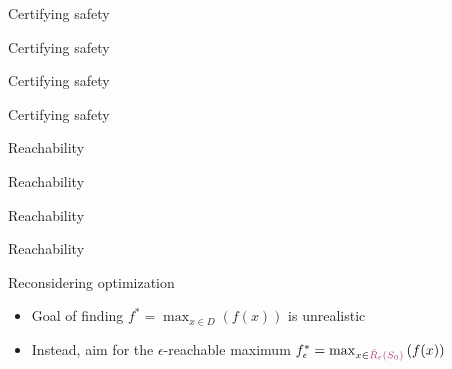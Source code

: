 \documentclass[xetex,10pt,mathserif,handout]{beamer}
\newlength\figureheight
\newlength\figurewidth
\newcommand{\Rbeps}{\bar{R}_{\epsilon}}
\newcommand{\ccrbeps}{{\color{magenta!70!black}\Rbeps(S_0)}\xspace}
\begin{document}
\begin{frame}{Certifying safety}
\centering
\setlength\figurewidth{5in}
\setlength\figureheight{3.5in}

\end{frame}

\begin{frame}{Certifying safety}
\centering
\setlength\figurewidth{5in}
\setlength\figureheight{3.5in}

\end{frame}

\begin{frame}{Certifying safety}
\centering
\setlength\figurewidth{5in}
\setlength\figureheight{3.5in}

\end{frame}

\begin{frame}{Certifying safety}
\centering
\setlength\figurewidth{5in}
\setlength\figureheight{3.5in}

\end{frame}

\begin{frame}{Reachability}
\centering
\setlength\figurewidth{5in}
\setlength\figureheight{3.5in}

\end{frame}

\begin{frame}{Reachability}
\centering
\setlength\figurewidth{5in}
\setlength\figureheight{3.5in}

\end{frame}

\begin{frame}{Reachability}
\centering
\setlength\figurewidth{5in}
\setlength\figureheight{3.5in}

\end{frame}

\begin{frame}{Reachability}
\centering
\setlength\figurewidth{5in}
\setlength\figureheight{3.5in}

\end{frame}

\begin{frame}{Reconsidering optimization}
\begin{itemize}
\item<2-> Goal of finding $f^* = \max_{x \in D}\left(f(x)\right)$ is unrealistic
\vspace{2em}
\item<3-> Instead, aim for the $\epsilon$-reachable maximum $f_{\epsilon}^* = \max_{x \in \ccrbeps}\left(f(x)\right)$
\end{itemize}
\end{frame}
\end{document}
